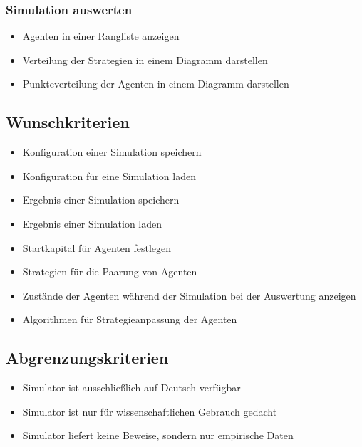 \subsubsection{Simulation auswerten}
\begin{itemize}
\item Agenten in einer Rangliste anzeigen
\item Verteilung der Strategien in einem Diagramm darstellen
\item Punkteverteilung der Agenten in einem Diagramm darstellen
\end{itemize}

%

\subsection{Wunschkriterien}
\begin{itemize}
\item Konfiguration einer Simulation speichern
\item Konfiguration für eine Simulation laden
\item Ergebnis einer Simulation speichern
\item Ergebnis einer Simulation laden
\item Startkapital für Agenten festlegen
\item Strategien für die Paarung von Agenten
\item Zustände der Agenten während der Simulation bei der Auswertung anzeigen
\item Algorithmen für Strategieanpassung der Agenten
\end{itemize}

\subsection{Abgrenzungskriterien}
\begin{itemize}
\item Simulator ist ausschließlich auf Deutsch verfügbar
\item Simulator ist nur für wissenschaftlichen Gebrauch gedacht
\item Simulator liefert keine Beweise, sondern nur empirische Daten
\end{itemize}